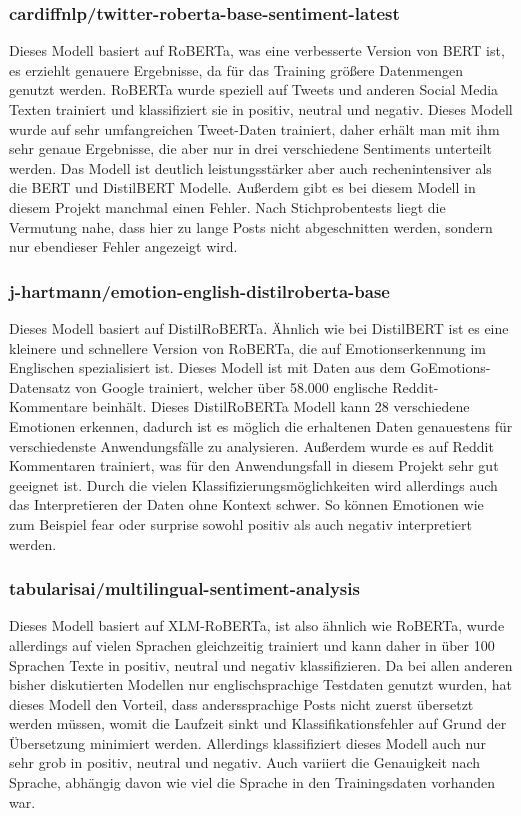 \subsubsection{cardiffnlp/twitter-roberta-base-sentiment-latest}
Dieses Modell basiert auf RoBERTa, was eine verbesserte Version von BERT ist, es erziehlt genauere Ergebnisse, da für das Training größere Datenmengen genutzt werden. RoBERTa wurde speziell auf Tweets und anderen Social Media Texten trainiert und klassifiziert sie in positiv, neutral und negativ. Dieses Modell wurde auf sehr umfangreichen Tweet-Daten trainiert, daher erhält man mit ihm sehr genaue Ergebnisse, die aber nur in drei verschiedene Sentiments unterteilt werden. Das Modell ist deutlich leistungsstärker aber auch rechenintensiver als die BERT und DistilBERT Modelle. Außerdem gibt es bei diesem Modell in diesem Projekt manchmal einen Fehler. Nach Stichprobentests liegt die Vermutung nahe, dass hier zu lange Posts nicht abgeschnitten werden, sondern nur ebendieser Fehler angezeigt wird.

\subsubsection{j-hartmann/emotion-english-distilroberta-base}
Dieses Modell basiert auf DistilRoBERTa. Ähnlich wie bei DistilBERT ist es eine kleinere und schnellere Version von RoBERTa, die auf Emotionserkennung im Englischen spezialisiert ist. Dieses Modell ist mit Daten aus dem GoEmotions-Datensatz von Google trainiert, welcher über 58.000 englische Reddit-Kommentare beinhält. Dieses DistilRoBERTa Modell kann 28 verschiedene Emotionen erkennen, dadurch ist es möglich die erhaltenen Daten genauestens für verschiedenste Anwendungsfälle zu analysieren. Außerdem wurde es auf Reddit Kommentaren trainiert, was für den Anwendungsfall in diesem Projekt sehr gut geeignet ist. Durch die vielen Klassifizierungsmöglichkeiten wird allerdings auch das Interpretieren der Daten ohne Kontext schwer. So können Emotionen wie zum Beispiel fear oder surprise sowohl positiv als auch negativ interpretiert werden.

\subsubsection{tabularisai/multilingual-sentiment-analysis}
Dieses Modell basiert auf XLM-RoBERTa, ist also ähnlich wie RoBERTa, wurde allerdings auf vielen Sprachen gleichzeitig trainiert und kann daher in über 100 Sprachen Texte in positiv, neutral und negativ klassifizieren. Da bei allen anderen bisher diskutierten Modellen nur englischsprachige Testdaten genutzt wurden, hat dieses Modell den Vorteil, dass anderssprachige Posts nicht zuerst übersetzt werden müssen, womit die Laufzeit sinkt und Klassifikationsfehler auf Grund der Übersetzung minimiert werden. Allerdings klassifiziert dieses Modell auch nur sehr grob in positiv, neutral und negativ. Auch variiert die Genauigkeit nach Sprache, abhängig davon wie viel die Sprache in den Trainingsdaten vorhanden war.

